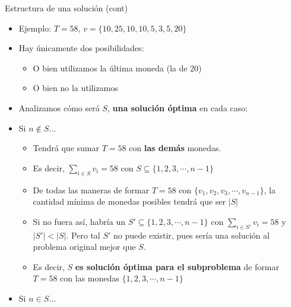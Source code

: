 \documentclass{beamer}
\begin{document}
\begin{frame}{Estructura de una solución (cont)}
    \begin{itemize}
    \item Ejemplo: $T= 58$, $v = \{10, 25, 10, 10, 5, 3, 5, 20 \}$
    \item Hay únicamente dos posibilidades:
            \begin{itemize}
                 \item O bien utilizamos la última moneda (la de 20)
                 \item O bien no la utilizamos
            \end{itemize}
    \item Analizamos cómo será $S$, \textbf{una solución óptima} en cada caso:
    \item Si $n \notin S$...
            \begin{itemize}
                 \item Tendrá que sumar $T=58$ con \textbf{las demás} monedas.
                 \item Es decir, $\sum_{i \in S}{v_i} = 58$ con $S \subseteq \{1, 2, 3, \cdots, n-1 \}$
                 \item De todas las maneras de formar $T=58$ con $\{ v_1, v_2, v_3, \cdots, v_{n-1} \}$, la cantidad mínima de monedas posibles tendrá que ser  $|S|$
                 \item Si no fuera así, habría un $S' \subseteq \{1,2, 3, \cdots, n-1 \}$ con $\sum_{i \in S'}{v_i} = 58$ y $|S'| < |S|$. Pero tal $S'$ no puede existir, pues sería una solución al problema original mejor que $S$.
                 \item Es decir, $S$ \textbf{es solución óptima para el subproblema} de formar $T=58$ con las monedas $\{1,2, 3, \cdots, n-1 \}$
            \end{itemize}
    \item Si $n \in S$...
    \end{itemize} 
\end{frame}
\end{document}
